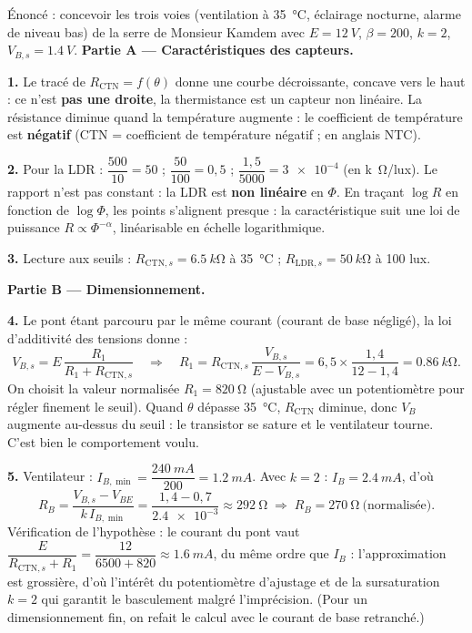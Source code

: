 \documentclass[11pt]{article}
\newcommand{\cle}[1]{{\popxbold\color{popdark}#1}}
\begin{document}
\begin{exoresolu}
Énoncé : concevoir les trois voies (ventilation à \SI{35}{\celsius}, éclairage nocturne, alarme de niveau bas) de la serre de Monsieur Kamdem avec $E = \SI{12}{V}$, $\beta = 200$, $k = 2$, $V_{B,s} = \SI{1,4}{V}$.
\tcblower
\textbf{Partie A — Caractéristiques des capteurs.}

\textbf{1.} Le tracé de $R_{\text{CTN}} = f(\theta)$ donne une courbe décroissante, concave vers le haut : ce n'est \textbf{pas une droite}, la thermistance est un capteur \cle{non linéaire}. La résistance diminue quand la température augmente : le coefficient de température est \textbf{négatif} (CTN = coefficient de température négatif ; en anglais NTC).

\textbf{2.} Pour la LDR : $\dfrac{500}{10} = 50$ ; $\dfrac{50}{100} = 0,5$ ; $\dfrac{1,5}{5000} = \num{3e-4}$ (en \si{k\ohm}/lux). Le rapport n'est pas constant : la LDR est \textbf{non linéaire} en $\Phi$. En traçant $\log R$ en fonction de $\log \Phi$, les points s'alignent presque : la caractéristique suit une loi de puissance $R \propto \Phi^{-\alpha}$, linéarisable en échelle logarithmique.

\textbf{3.} Lecture aux seuils : $R_{\text{CTN},s} = \SI{6,5}{k\ohm}$ à \SI{35}{\celsius} ; $R_{\text{LDR},s} = \SI{50}{k\ohm}$ à 100 lux.

\textbf{Partie B — Dimensionnement.}

\textbf{4.} Le pont étant parcouru par le même courant (courant de base négligé), la loi d'additivité des tensions donne :
\[ V_{B,s} = E\,\dfrac{R_1}{R_1 + R_{\text{CTN},s}} \quad\Longrightarrow\quad R_1 = R_{\text{CTN},s}\,\dfrac{V_{B,s}}{E - V_{B,s}} = 6,5\times\dfrac{1,4}{12 - 1,4} = \SI{0,86}{k\ohm}. \]
On choisit la valeur normalisée $R_1 = \SI{820}{\ohm}$ (ajustable avec un potentiomètre pour régler finement le seuil). Quand $\theta$ dépasse \SI{35}{\celsius}, $R_{\text{CTN}}$ diminue, donc $V_B$ augmente au-dessus du seuil : le transistor se sature et le ventilateur tourne. C'est bien le comportement voulu.

\textbf{5.} Ventilateur : $I_{B,\min} = \dfrac{\SI{240}{mA}}{200} = \SI{1,2}{mA}$. Avec $k = 2$ : $I_B = \SI{2,4}{mA}$, d'où
\[ R_B = \dfrac{V_{B,s} - V_{BE}}{k\,I_{B,\min}} = \dfrac{1,4 - 0,7}{\num{2,4e-3}} \approx \SI{292}{\ohm} \;\Rightarrow\; R_B = \SI{270}{\ohm}\ \text{(normalisée)}. \]
Vérification de l'hypothèse : le courant du pont vaut $\dfrac{E}{R_{\text{CTN},s} + R_1} = \dfrac{12}{6500 + 820} \approx \SI{1,6}{mA}$, du même ordre que $I_B$ : l'approximation est grossière, d'où l'intérêt du potentiomètre d'ajustage et de la sursaturation $k = 2$ qui garantit le basculement malgré l'imprécision. (Pour un dimensionnement fin, on refait le calcul avec le courant de base retranché.)


\end{exoresolu}
\end{document}
